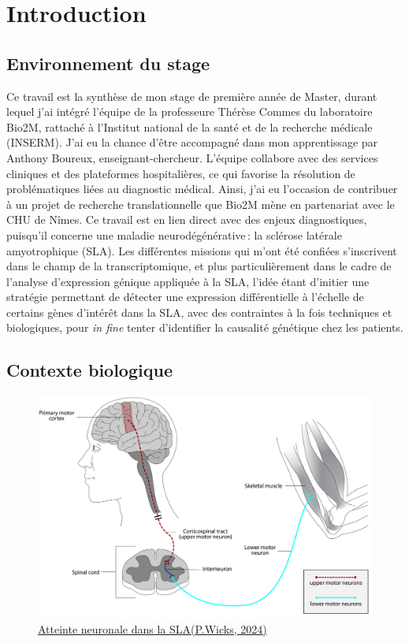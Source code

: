 \section{Introduction}
\subsection{Environnement du stage}

Ce travail est la synthèse de mon stage de première année de Master, durant lequel j’ai intégré l’équipe de la professeure Thérèse Commes du laboratoire Bio2M,  
rattaché à l’Institut national de la santé et de la recherche médicale (INSERM). J’ai eu la chance d’être accompagné dans mon apprentissage par Anthony Boureux, enseignant-chercheur.  
L’équipe collabore  avec des services cliniques et des plateformes hospitalières, ce qui favorise la résolution de problématiques liées au diagnostic médical.  
Ainsi, j’ai eu l’occasion de contribuer à un projet de recherche translationnelle que Bio2M mène en partenariat avec le CHU de Nîmes. Ce travail est en lien direct avec des enjeux diagnostiques,
 puisqu’il concerne une maladie neurodégénérative : la sclérose latérale amyotrophique (SLA).  
Les différentes missions qui m’ont été confiées s’inscrivent dans le champ de la transcriptomique, et plus particulièrement dans le cadre de l’analyse d’expression génique appliquée à la SLA,  
l’idée étant d’initier une stratégie permettant de détecter une expression différentielle à l’échelle de certains gènes d’intérêt dans la SLA, avec des contraintes à la fois techniques et biologiques,  
pour \textit{in fine} tenter d’identifier la causalité génétique chez les patients.

\subsection{Contexte biologique}

\begin{figure} 
    \centering
    \includegraphics[width=1\linewidth]{Cortex_Spinal.jpg}
    \caption{\underline{Atteinte neuronale dans la SLA(P.Wicks, 2024)}}
    \label{fig:Cortex}
\end{figure}

